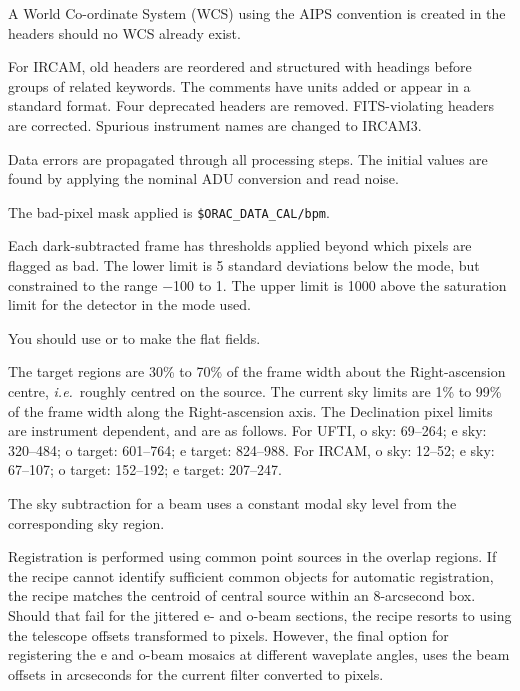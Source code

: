 \documentclass[twoside,11pt,nolof]{starlink}
\begin{document}
{{{         \sstitem
         A World Co-ordinate System (WCS) using the AIPS convention is
         created in the headers should no WCS already exist.

         \sstitem
         For IRCAM, old headers are reordered and structured with
         headings before groups of related keywords.  The comments have
         units added or appear in a standard format.  Four deprecated
         headers are removed.  FITS-violating headers are corrected.
         Spurious instrument names are changed to IRCAM3.

         \sstitem
         Data errors are propagated through all processing steps.
         The initial values are found by applying the nominal ADU conversion
         and read noise.

         \sstitem
         The bad-pixel mask applied is {\tt\$ORAC\_DATA\_CAL/bpm}.

         \sstitem
         Each dark-subtracted frame has thresholds applied beyond which
         pixels are flagged as bad.  The lower limit is 5 standard
         deviations below the mode, but constrained to the range $-$100 to 1.
         The upper limit is 1000 above the saturation limit for the detector
         in the mode used.

         \sstitem
         You should use  or
          to make the
         flat fields.

         \sstitem
         The target regions are 30\% to 70\% of the frame width about
         the Right-ascension centre, \emph{{i.e.}}\ roughly centred on the source.
         The current sky limits are 1\% to 99\% of the frame width along the
         Right-ascension axis.  The Declination pixel limits are instrument
         dependent, and are as follows.  For UFTI, o sky: 69--264;
         e sky: 320--484; o target: 601--764; e target: 824--988.  For
         IRCAM, o sky: 12--52; e sky: 67--107; o target: 152--192;
         e target: 207--247.

         \sstitem
         The sky subtraction for a beam uses a constant modal sky level
         from the corresponding sky region.

         \sstitem
         Registration is performed using common point sources in the
         overlap regions.  If the recipe cannot identify sufficient common
         objects for automatic registration, the recipe matches the centroid
         of central source within an 8-arcsecond box.  Should that fail for
         the jittered e- and o-beam sections, the recipe resorts to using the
         telescope offsets transformed to pixels.  However, the final option
         for registering the e and o-beam mosaics at different waveplate
         angles, uses the beam offsets in arcseconds for the current filter
         converted to pixels.

}}}
\end{document}
